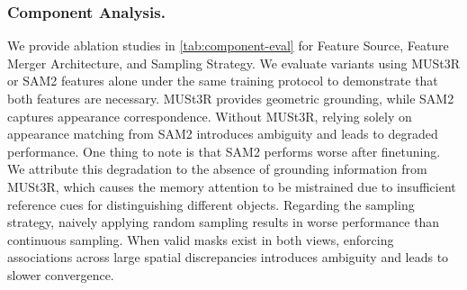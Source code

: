 \subsubsection{Component Analysis.}
We provide ablation studies in \cref{tab:component-eval} for Feature Source, Feature Merger Architecture, and Sampling Strategy.
We evaluate variants using MUSt3R or SAM2 features alone under the same training protocol to demonstrate that both features are necessary. MUSt3R provides geometric grounding, while SAM2 captures appearance correspondence. Without MUSt3R, relying solely on appearance matching from SAM2 introduces ambiguity and leads to degraded performance. One thing to note is that SAM2 performs worse after finetuning. We attribute this degradation to the absence of grounding information from MUSt3R, which causes the memory attention to be mistrained due to insufficient reference cues for distinguishing different objects.
Regarding the sampling strategy, naively applying random sampling results in worse performance than continuous sampling. When valid masks exist in both views, enforcing associations across large spatial discrepancies introduces ambiguity and leads to slower convergence.

\begin{table}[t]
\centering
\setlength{\tabcolsep}{2mm}
\caption{\textbf{Component analysis on ScanNet++ selected subset.}}
\label{tab:component-eval}
\vspace{-3mm}
\end{table}

